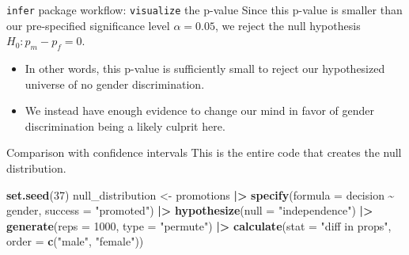 \documentclass[
  ignorenonframetext,
]{beamer}
\newenvironment{Shaded}{\begin{snugshade}}{\end{snugshade}}
\newcommand{\AttributeTok}[1]{\textcolor[rgb]{0.13,0.29,0.53}{#1}}
\newcommand{\DecValTok}[1]{\textcolor[rgb]{0.00,0.00,0.81}{#1}}
\newcommand{\FunctionTok}[1]{\textcolor[rgb]{0.13,0.29,0.53}{\textbf{#1}}}
\newcommand{\NormalTok}[1]{#1}
\newcommand{\OtherTok}[1]{\textcolor[rgb]{0.56,0.35,0.01}{#1}}
\newcommand{\SpecialCharTok}[1]{\textcolor[rgb]{0.81,0.36,0.00}{\textbf{#1}}}
\newcommand{\StringTok}[1]{\textcolor[rgb]{0.31,0.60,0.02}{#1}}
\begin{document}
\begin{frame}{\texttt{infer} package workflow: \texttt{visualize} the
p-value}
\protect\hypertarget{infer-package-workflow-visualize-the-p-value-2}{}
Since this p-value is smaller than our pre-specified significance level
\(\alpha=0.05\), we reject the null hypothesis \(H_0: p_m-p_f=0\).

\begin{itemize}
\item
  In other words, this p-value is sufficiently small to reject our
  hypothesized universe of no gender discrimination.
\item
  We instead have enough evidence to change our mind in favor of gender
  discrimination being a likely culprit here.
\end{itemize}
\end{frame}

\begin{frame}[fragile]{Comparison with confidence intervals}
\protect\hypertarget{comparison-with-confidence-intervals}{}
This is the entire code that creates the null distribution.

\begin{Shaded}
\begin{Highlighting}[]
\FunctionTok{set.seed}\NormalTok{(}\DecValTok{37}\NormalTok{)}
\NormalTok{null\_distribution }\OtherTok{\textless{}{-}}\NormalTok{ promotions }\SpecialCharTok{|\textgreater{}} 
  \FunctionTok{specify}\NormalTok{(}\AttributeTok{formula =}\NormalTok{ decision }\SpecialCharTok{\textasciitilde{}}\NormalTok{ gender, }
          \AttributeTok{success =} \StringTok{"promoted"}\NormalTok{) }\SpecialCharTok{|\textgreater{}} 
  \FunctionTok{hypothesize}\NormalTok{(}\AttributeTok{null =} \StringTok{"independence"}\NormalTok{) }\SpecialCharTok{|\textgreater{}} 
  \FunctionTok{generate}\NormalTok{(}\AttributeTok{reps =} \DecValTok{1000}\NormalTok{, }\AttributeTok{type =} \StringTok{"permute"}\NormalTok{) }\SpecialCharTok{|\textgreater{}} 
  \FunctionTok{calculate}\NormalTok{(}\AttributeTok{stat =} \StringTok{"diff in props"}\NormalTok{, }
            \AttributeTok{order =} \FunctionTok{c}\NormalTok{(}\StringTok{"male"}\NormalTok{, }\StringTok{"female"}\NormalTok{))}
\end{Highlighting}
\end{Shaded}
\end{frame}
\end{document}
